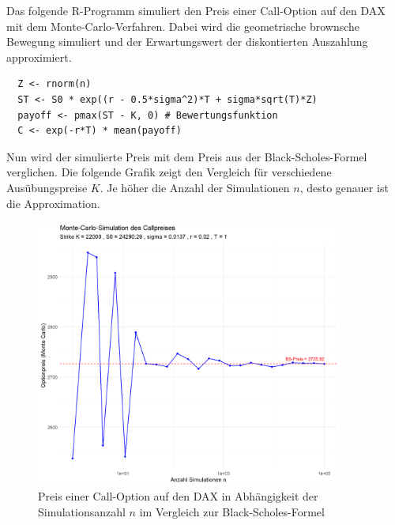 \begin{bsp}

Das folgende R-Programm simuliert den Preis einer Call-Option auf den DAX
mit dem Monte-Carlo-Verfahren. Dabei wird die geometrische brownsche Bewegung
simuliert und der Erwartungswert der diskontierten Auszahlung approximiert.

\begin{lstlisting}
  Z <- rnorm(n)
  ST <- S0 * exp((r - 0.5*sigma^2)*T + sigma*sqrt(T)*Z)
  payoff <- pmax(ST - K, 0) # Bewertungsfunktion
  C <- exp(-r*T) * mean(payoff)
\end{lstlisting}
Nun wird der simulierte Preis mit dem Preis aus der Black-Scholes-Formel verglichen. 
Die folgende Grafik zeigt den Vergleich für verschiedene Ausübungspreise $K$.
Je höher die Anzahl der Simulationen $n$, desto genauer ist die Approximation.

\begin{figure}[H]
    \centering
    \includegraphics[width=0.9\textwidth]{images/call_dax_mc.png}
    \caption{Preis einer Call-Option auf den DAX in Abhängigkeit der Simulationsanzahl $n$ im Vergleich zur Black-Scholes-Formel}
    \label{fig:call_dax_mc}
\end{figure}

\end{bsp}

